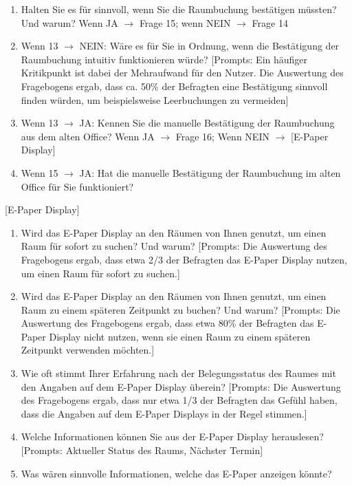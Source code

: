 \begin{enumerate}
    \item Halten Sie es für sinnvoll, wenn Sie die Raumbuchung bestätigen müssten? Und warum? Wenn JA $\rightarrow$ Frage 15; wenn NEIN $\rightarrow$ Frage 14
    
    \item Wenn 13 $\rightarrow$ NEIN: Wäre es für Sie in Ordnung, wenn die Bestätigung der Raumbuchung intuitiv funktionieren würde? [Prompts: Ein häufiger Kritikpunkt ist dabei der Mehraufwand für den Nutzer. Die Auswertung des Fragebogens ergab, dass ca. 50\% der Befragten eine Bestätigung sinnvoll finden würden, um beispielsweise Leerbuchungen zu vermeiden]
    
    \item Wenn 13 $\rightarrow$ JA: Kennen Sie die manuelle Bestätigung der Raumbuchung aus dem alten Office? Wenn JA $\rightarrow$ Frage 16; Wenn NEIN $\rightarrow$ [E-Paper Display]
    
    \item Wenn 15 $\rightarrow$ JA: Hat die manuelle Bestätigung der Raumbuchung im alten Office für Sie funktioniert? 

\end{enumerate}

[E-Paper Display]

\begin{enumerate}

    \item Wird das E-Paper Display an den Räumen von Ihnen genutzt, um einen Raum für sofort zu suchen? Und warum? [Prompts: Die Auswertung des Fragebogens ergab, dass etwa 2/3 der Befragten das E-Paper Display nutzen, um einen Raum für sofort zu suchen.]

    \item Wird das E-Paper Display an den Räumen von Ihnen genutzt, um einen Raum zu einem späteren Zeitpunkt zu buchen? Und warum? [Prompts: Die Auswertung des Fragebogens ergab, dass etwa 80\% der Befragten das E-Paper Display nicht nutzen, wenn sie einen Raum zu einem späteren Zeitpunkt verwenden möchten.]

    \item Wie oft stimmt Ihrer Erfahrung nach der Belegungsstatus des Raumes mit den Angaben auf dem E-Paper Display überein? [Prompts: Die Auswertung des Fragebogens ergab, dass nur etwa 1/3 der Befragten das Gefühl haben, dass die Angaben auf dem E-Paper Displays in der Regel stimmen.]

    \item Welche Informationen können Sie aus der E-Paper Display herauslesen? [Prompts: Aktueller Status des Raums, Nächster Termin]

    \item Was wären sinnvolle Informationen, welche das E-Paper anzeigen könnte?
    
\end{enumerate}

